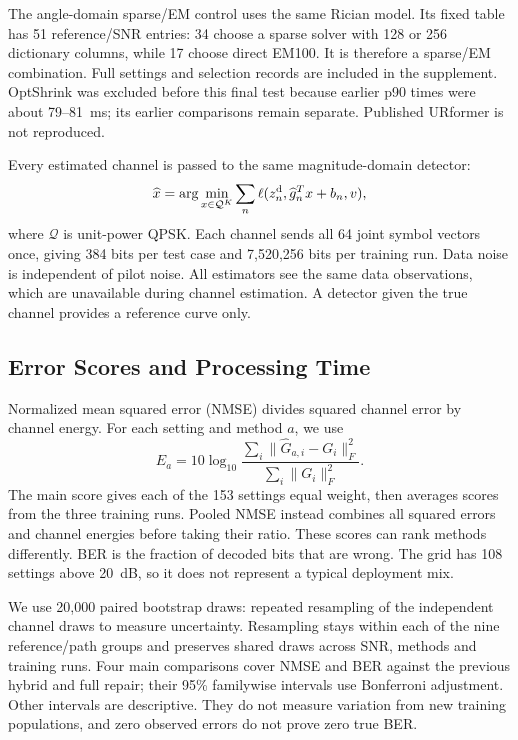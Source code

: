 The angle-domain sparse/EM control uses the same Rician model. Its fixed table has 51 reference/SNR entries: 34 choose a sparse solver with 128 or 256 dictionary columns, while 17 choose direct EM100. It is therefore a sparse/EM combination. Full settings and selection records are included in the supplement. OptShrink was excluded before this final test because earlier p90 times were about 79--81~ms; its earlier comparisons remain separate. Published URformer is not reproduced.

Every estimated channel is passed to the same magnitude-domain detector:
\begin{equation}
 \widehat x=\arg\min_{x\in\mathcal Q^K}\sum_n
 \ell(z_n^{\rm d},\widehat g_n^Tx+b_n,v),
\end{equation}
where $\mathcal Q$ is unit-power QPSK. Each channel sends all 64 joint symbol vectors once, giving 384 bits per test case and 7,520,256 bits per training run. Data noise is independent of pilot noise. All estimators see the same data observations, which are unavailable during channel estimation. A detector given the true channel provides a reference curve only.

\subsection{Error Scores and Processing Time}
Normalized mean squared error (NMSE) divides squared channel error by channel energy. For each setting and method $a$, we use
\begin{equation}
 E_a=10\log_{10}\frac{\sum_i\|\widehat G_{a,i}-G_i\|_F^2}
 {\sum_i\|G_i\|_F^2}.
 \label{eq:nmse}
\end{equation}
The main score gives each of the 153 settings equal weight, then averages scores from the three training runs. Pooled NMSE instead combines all squared errors and channel energies before taking their ratio. These scores can rank methods differently. BER is the fraction of decoded bits that are wrong. The grid has 108 settings above 20~dB, so it does not represent a typical deployment mix.

We use 20,000 paired bootstrap draws: repeated resampling of the independent channel draws to measure uncertainty. Resampling stays within each of the nine reference/path groups and preserves shared draws across SNR, methods and training runs. Four main comparisons cover NMSE and BER against the previous hybrid and full repair; their 95\% familywise intervals use Bonferroni adjustment. Other intervals are descriptive. They do not measure variation from new training populations, and zero observed errors do not prove zero true BER.

